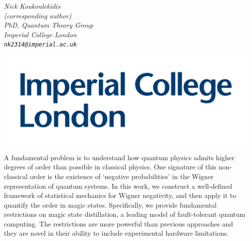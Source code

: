 \documentclass[12pt]{letter}
\begin{document}
\hfill\begin{minipage}{6cm}
	\raggedright
	\vspace{-2.5cm}
	{\footnotesize\itshape Nick Koukoulekidis}\\
	{\footnotesize\itshape (corresponding author)}\\
	{\footnotesize\itshape PhD, Quantum Theory Group}\\
	{\footnotesize\itshape Imperial College London}\\
	{\footnotesize\itshape %
		\verb|nk2314@imperial.ac.uk|}\\
\end{minipage}

\vspace{-3.6cm}
\hspace{-0.5cm}\includegraphics[scale=.12]{icllogo.png}
\vspace{1.5cm}

A fundamental problem is to understand how quantum physics admits higher degrees of order than possible in classical physics. 
One signature of this non-classical order is the existence of `negative probabilities' in the Wigner representation of quantum systems. 
In this work, we construct a well-defined framework of statistical mechanics for Wigner negativity, and then apply it to quantify the order in magic states.
Specifically, we provide fundamental restrictions on magic state distillation, a leading model of fault-tolerant quantum computing. 
The restrictions are more powerful than previous approaches and they are novel in their ability to include experimental hardware limitations.
\end{document}
